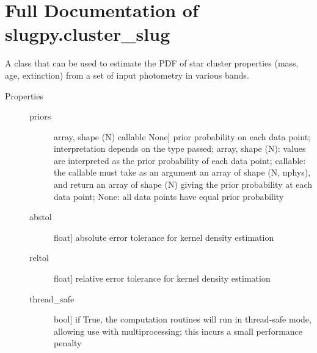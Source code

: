 \documentclass[letterpaper,10pt,english]{sphinxmanual}
\begin{document}
\section{Full Documentation of slugpy.cluster\_slug}
\label{\detokenize{cluster_slug:ssec-cluster-slug-full}}\label{\detokenize{cluster_slug:full-documentation-of-slugpy-cluster-slug}}

\begin{fulllineitems}
\label{\detokenize{cluster_slug:slugpy.cluster_slug.cluster_slug}}
A class that can be used to estimate the PDF of star cluster
properties (mass, age, extinction) from a set of input photometry
in various bands.
\begin{description}
\item[{Properties}] \leavevmode\begin{description}
\item[{priors}] \leavevmode{[}array, shape (N) \textbar{} callable \textbar{} None{]}
prior probability on each data point; interpretation
depends on the type passed; array, shape (N): values are
interpreted as the prior probability of each data point;
callable: the callable must take as an argument an array
of shape (N, nphys), and return an array of shape (N)
giving the prior probability at each data point; None:
all data points have equal prior probability

\item[{abstol}] \leavevmode{[}float{]}
absolute error tolerance for kernel density estimation

\item[{reltol}] \leavevmode{[}float{]}
relative error tolerance for kernel density estimation

\item[{thread\_safe}] \leavevmode{[}bool{]}
if True, the computation routines will run in thread-safe
mode, allowing use with multiprocessing; this incurs a small
performance penalty

\end{description}


\end{description}
\end{fulllineitems}
\end{document}
